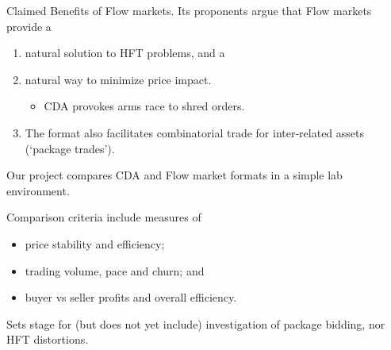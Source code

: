 \documentclass[10pt]{beamer}
\begin{document}
\begin{frame}{Claimed Benefits of Flow markets.}
Its proponents argue that Flow markets provide a
\begin{enumerate}
 \item natural solution to HFT problems, and a %
\item natural way to minimize price impact. 
\begin{itemize}
    \item CDA provokes arms race to shred orders. 
\end{itemize} %
\item The format also facilitates combinatorial trade for inter-related assets (`package trades').
\end{enumerate} 
\end{frame}

\begin{frame}{Our project}
compares CDA and Flow market formats in a simple lab environment. %

Comparison criteria include measures of
\begin{itemize}
 \item  price stability and efficiency; %
\item trading volume, pace and churn; and %
\item buyer vs seller profits and overall efficiency. 
\end{itemize} 
Sets stage for (but does not yet include) investigation of  package bidding, nor HFT distortions.
\end{frame}

\end{document}
